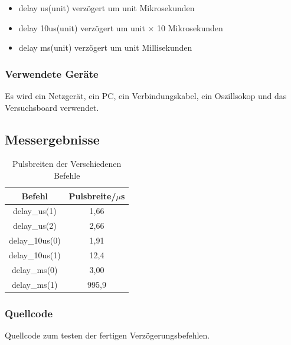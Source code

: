 \documentclass[12pt,a4paper]{article}
\begin{document}
\begin{itemize}
\item	delay us(unit) verzögert um unit Mikrosekunden

\item	delay 10us(unit) verzögert um unit $\times$ 10 Mikrosekunden

\item	delay ms(unit) verzögert um unit Millisekunden
\end{itemize}

\subsubsection*{Verwendete Geräte}

Es wird ein Netzgerät, ein PC, ein Verbindungskabel, ein Oszillsokop und das Versuchsboard verwendet.


\subsection*{Messergebnisse}
\begin{table}[H]
\centering
\begin{tabular}{|c|c|}
\hline Befehl & Pulsbreite/$\mu$s \\ \hline
\hline delay\_us(1) & 1,66 \\ 
\hline delay\_us(2) & 2,66 \\ 
\hline delay\_10us(0) & 1,91 \\ 
\hline delay\_10us(1) & 12,4 \\ 
\hline delay\_ms(0) & 3,00 \\ 
\hline delay\_ms(1) & 995,9 \\ 
\hline 
\end{tabular} 
\caption{Pulsbreiten der Verschiedenen Befehle}
\label{tab:puls_1}
\end{table}


\subsubsection*{Quellcode}

Quellcode zum testen der fertigen Verzögerungsbefehlen.
\end{document}
